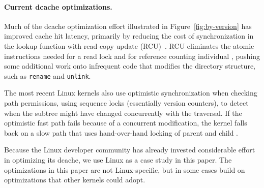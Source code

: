 \paragraph{Current dcache optimizations.}
Much of the dcache optimization effort illustrated in Figure~\ref{fig:by-version}
has improved cache hit latency, primarily by reducing the cost of
synchronization in the lookup function with read-copy update (RCU)~\cite{mckenney04rcu,dcachercu04}.
RCU eliminates the atomic instructions needed for a read lock and for reference counting individual \dentries{},
pushing some additional work onto infrequent code that modifies the directory structure,
such as {\tt rename} and {\tt unlink}.

The most recent Linux kernels also use optimistic synchronization when checking
path permissions, using sequence locks (essentially version counters), 
to detect when the subtree might have changed concurrently with the traversal.
If the optimistic fast path fails because of a concurrent modification, 
the kernel falls back on a slow path that uses
hand-over-hand locking of parent and child \dentries{}.

Because the Linux developer community has already invested considerable effort 
in optimizing its dcache, we use Linux as a case study in this paper.
The optimizations in this paper are not Linux-specific,
but in some cases build on optimizations that other kernels could adopt. 



